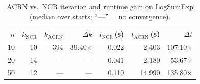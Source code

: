 \begin{table}[ht]
  \centering
  \caption{ACRN vs.\ NCR iteration and runtime gain on LogSumExp (median over starts; ``---'' = no convergence).}
  \label{tab:acrn_gain}
  \begin{tabular}{|r|r|r|r|r|r|r|}
    \hline
    $n$ & $k_\mathrm{NCR}$ & $k_\mathrm{ACRN}$ & $\Delta k$ & $t_\mathrm{NCR}$\,(s) & $t_\mathrm{ACRN}$\,(s) & $\Delta t$ \\
    \hline\hline
    10 & 10 & 394 & 39.40× & 0.022 & 2.403 & 107.10× \\
    \hline
    20 & 14 & --- & --- & 0.041 & 2.180 & 53.67× \\
    \hline
    50 & 12 & --- & --- & 0.110 & 14.990 & 135.80× \\
    \hline
  \end{tabular}
\end{table}